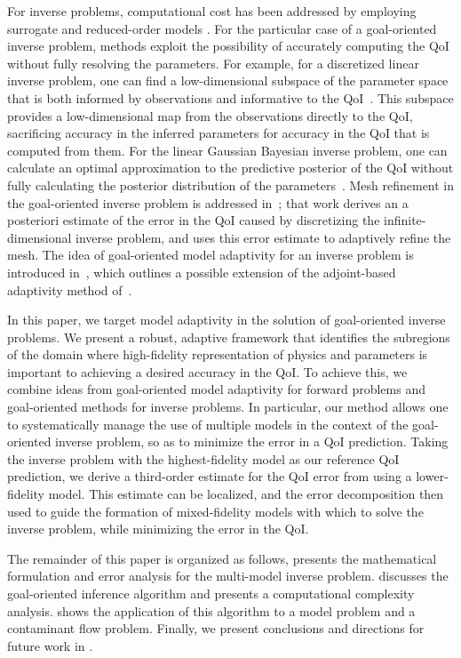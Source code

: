 For inverse problems, computational cost has been addressed by employing surrogate and reduced-order models \cite{MarzNajmRahn07, WangZab04, StefSanNav15, Frangosetal10}. For the particular case of a goal-oriented inverse problem, methods exploit the possibility of accurately computing the QoI without fully resolving the parameters. For example, for a discretized linear inverse problem, one can find a low-dimensional subspace of the parameter space that is both informed by observations and informative to the QoI~\cite{LiebWill13}. This subspace provides a low-dimensional map from the observations directly to the QoI, sacrificing accuracy in the inferred parameters for accuracy in the QoI that is computed from them. For the linear Gaussian Bayesian inverse problem, one can calculate an optimal approximation to the predictive posterior of the QoI without fully calculating the posterior distribution of the parameters~\cite{Span16}. Mesh refinement in the goal-oriented inverse problem is addressed in~\cite{BecVex05}; that work derives an a posteriori estimate of the error in the QoI caused by discretizing the infinite-dimensional inverse problem, and uses this error estimate to adaptively refine the mesh. The idea of goal-oriented model adaptivity for an inverse problem is introduced in~\cite{OdenPrudetal10}, which outlines a possible extension of the adjoint-based adaptivity method of~\cite{OdenPrudetal06}.

In this paper, we target model adaptivity in the solution of goal-oriented inverse problems. We present a robust, adaptive framework that identifies the subregions of the domain where high-fidelity representation of physics and parameters is important to achieving a desired accuracy in the QoI. To achieve this, we combine ideas from goal-oriented model adaptivity for forward problems and goal-oriented methods for inverse problems. In particular, our method allows one to systematically manage the use of multiple models in the context of the goal-oriented inverse problem, so as to minimize the error in a QoI prediction. Taking the inverse problem with the highest-fidelity model as our reference QoI prediction, we derive a third-order estimate for the QoI error from using a lower-fidelity model. This estimate can be localized, and the error decomposition then used to guide the formation of mixed-fidelity models with which to solve the inverse problem, while minimizing the error in the QoI. 

The remainder of this paper is organized as follows,  presents the mathematical formulation and error analysis for the multi-model inverse problem.  discusses the goal-oriented inference algorithm and presents a computational complexity analysis.  shows the application of this algorithm to a model problem and a contaminant flow problem. Finally, we present conclusions and directions for future work in .

